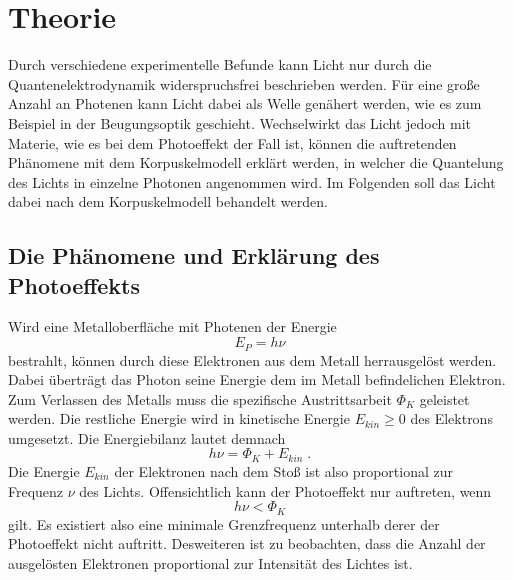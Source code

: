 \section{Theorie}
\label{sec:Theorie}
Durch verschiedene experimentelle Befunde kann Licht nur durch die Quantenelektrodynamik widerspruchsfrei beschrieben werden. 
Für eine große Anzahl an Photenen kann Licht dabei als Welle genähert werden, wie es zum Beispiel in der Beugungsoptik geschieht. 
Wechselwirkt das Licht jedoch mit Materie, wie es bei dem Photoeffekt der Fall ist, können die auftretenden Phänomene mit dem 
Korpuskelmodell erklärt werden, in welcher die Quantelung des Lichts in einzelne Photonen angenommen wird. Im Folgenden soll 
das Licht dabei nach dem Korpuskelmodell behandelt werden. 

\subsection{Die Phänomene und Erklärung des Photoeffekts}
\label{sec:phänomene}
Wird eine Metalloberfläche mit Photenen der Energie 
\begin{equation}
    E_{P}=h\nu
    \label{eqn:photon}
\end{equation}
bestrahlt, können durch diese Elektronen aus dem Metall herrausgelöst werden. Dabei überträgt das Photon seine Energie dem im Metall 
befindelichen Elektron. %
Zum Verlassen des Metalls muss die spezifische 
Austrittsarbeit $\Phi_K$ geleistet werden. Die restliche Energie wird in kinetische Energie $E_{kin}\geq 0$ des Elektrons umgesetzt. Die 
Energiebilanz lautet demnach
\begin{equation}
    h\nu=\Phi_K+E_{kin}\;.
    \label{eqn:bilanz}
\end{equation}
Die Energie $E_{kin}$ der Elektronen nach dem Stoß ist also proportional zur Frequenz $\nu$ des Lichts.
Offensichtlich kann der Photoeffekt nur auftreten, wenn
\begin{equation*}
    h\nu<\Phi_K
\end{equation*}
gilt. Es existiert also eine minimale Grenzfrequenz unterhalb derer der Photoeffekt nicht auftritt.
Desweiteren ist zu beobachten, dass die Anzahl der ausgelösten Elektronen proportional zur Intensität des Lichtes ist. 

